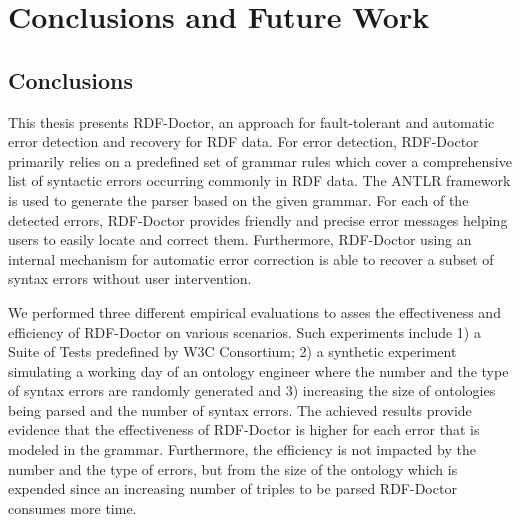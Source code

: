 \chapter{Conclusions and Future Work}
\label{ch:conclusions}

\section{Conclusions}

This thesis presents RDF-Doctor, an approach for fault-tolerant and automatic error detection and recovery for RDF data.
For error detection, RDF-Doctor primarily relies on a predefined set of grammar rules which cover a comprehensive list of syntactic errors occurring commonly in RDF data.
The ANTLR framework is used to generate the parser based on the given grammar.
For each of the detected errors, RDF-Doctor provides friendly and precise error messages helping users to easily locate and correct them.
Furthermore, RDF-Doctor using an internal mechanism for automatic error correction is able to recover a subset of syntax errors without user intervention.

We performed three different empirical evaluations to asses the effectiveness and efficiency of RDF-Doctor on various scenarios. Such experiments include 1) a Suite of Tests predefined by W3C Consortium; 2) a synthetic experiment simulating a working day of an ontology engineer where the number and the type of syntax errors are randomly generated and 3) increasing the size of ontologies being parsed and the number of syntax errors.
The achieved results provide evidence that the effectiveness of RDF-Doctor is higher for each error that is modeled in the grammar. 
Furthermore, the efficiency is not impacted by the number and the type of errors, but from the size of the ontology which is expended since  an increasing number of triples to be parsed RDF-Doctor consumes more time. 




